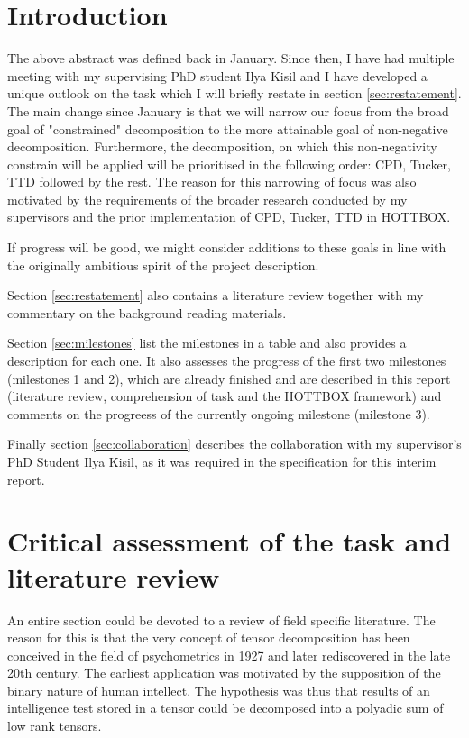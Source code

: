 \documentclass{article}
\begin{document}
\section{Introduction}

The above abstract was defined back in January. Since then, I have had multiple meeting with my supervising PhD student Ilya Kisil and I have developed a unique outlook on the task which I will briefly restate in section \ref{sec:restatement}. The main change since January is that we will narrow our focus from the broad goal of "constrained" decomposition to the more attainable goal of non-negative decomposition. Furthermore, the decomposition, on which this non-negativity constrain will be applied will be prioritised in the following order: CPD, Tucker, TTD followed by the rest. The reason for this narrowing of focus was also motivated by the requirements of the broader research conducted by my supervisors and the prior implementation of CPD, Tucker, TTD in HOTTBOX. 

If progress will be good, we might consider additions to these goals in line with the originally ambitious spirit of the project description.

Section \ref{sec:restatement} also contains a literature review together with my commentary on the background reading materials.

Section \ref{sec:milestones} list the milestones in a table and also provides a description for each one. It also assesses the progress of the first two milestones (milestones 1 and 2), which are already finished and are described in this report (literature review, comprehension of task and the HOTTBOX framework) and comments on the progreess of the currently ongoing milestone (milestone 3).

Finally section \ref{sec:collaboration} describes the collaboration with my supervisor's PhD Student Ilya Kisil, as it was required in the specification for this interim report.

\section{Critical assessment of the task and literature review\label{sec:restatement}}

An entire section could be devoted to a review of field specific literature. The reason for this is that the very concept of tensor decomposition has been conceived in the field of psychometrics \cite{hitchcock1927expression} in 1927 and later rediscovered in the late 20th century. The earliest application was motivated by the supposition of the binary nature of human intellect. The hypothesis was thus that results of an intelligence test stored in a tensor could be decomposed into a polyadic sum of low rank tensors.
\end{document}
